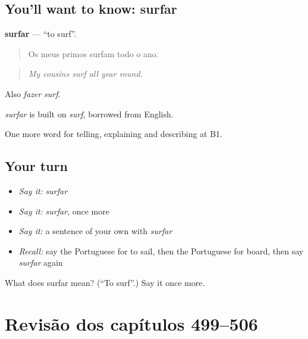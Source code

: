 \subsection*{You'll want to know: surfar}
\textbf{surfar} — \textquotedblleft{}to surf\textquotedblright{}.

\begin{quote}
Os meus primos surfam todo o ano.
\end{quote}

\begin{quote}
\emph{My cousins surf all year round.}
\end{quote}

Also \emph{fazer surf}.

\begin{cousinweb}
\emph{surfar} is built on \emph{surf}, borrowed from English.
\end{cousinweb}

\begin{grammarlens}[title={What you've built}]
One more word for telling, explaining and describing at B1.
\end{grammarlens}

\subsection*{Your turn}
\begin{itemize}
\raggedright
  \item \emph{Say it:} \emph{surfar}
  \item \emph{Say it:} \emph{surfar}, once more
  \item \emph{Say it:} a sentence of your own with \emph{surfar}
  \item \emph{Recall:} say the Portuguese for to sail, then the Portuguese for board, then say \emph{surfar} again
\end{itemize}

\begin{tcolorbox}[breakable,colback=teal!4,colframe=teal!35!black,title={Before you move on}]
What does surfar mean? (\textquotedblleft{}To surf\textquotedblright{}.) Say it once more.
\end{tcolorbox}
\section[(dialogue)]{Revisão dos capítulos 499–506}

\label{lesson:PT-R506-revisao-499-506}



